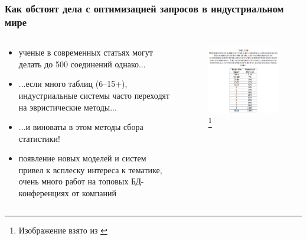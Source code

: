 \documentclass{beamer}
\begin{document}
\begin{frame}[allowframebreaks]
\frametitle{Как обстоят дела с оптимизацией запросов в индустриальном мире}

\begin{columns}
	\begin{column}{0.48\textwidth}	
		\begin{itemize}
			\item ученые в современных статьях могут делать до 500 соединений однако...
			\item ...если много таблиц (6--15+), индустриальные системы часто переходят на эвристические методы...
			\item ...и виноваты в этом методы сбора статистики!
			\item появление новых моделей и систем привел к всплеску интереса к тематике, очень много работ на топовых БД-конференциях от компаний
		\end{itemize}
		
	\end{column}
	\begin{column}{0.48\textwidth}
		\begin{figure}[htb]
			\includegraphics[width=\textwidth,height=0.930\textheight,keepaspectratio]{tablenum.png}\footnote{Изображение взято из \cite{Vertica}}
		\end{figure}			
	\end{column}
\end{columns}


\end{frame}
\end{document}
